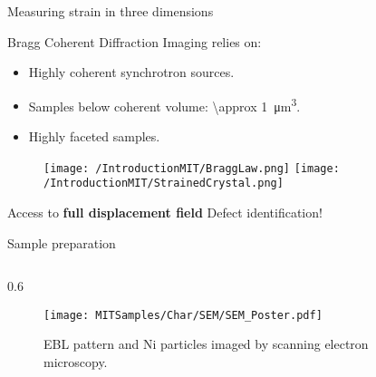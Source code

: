 
\separatorcolumn

\begin{column}{\colwidth}

    \begin{alertblock}{Measuring strain in three dimensions}

        Bragg Coherent Diffraction Imaging relies on:

        \begin{itemize}
            \setlength\itemsep{1em}
            \item Highly coherent synchrotron sources.
            \item Samples below coherent volume: \qty{\approx 1}{\um^3}.
            \item Highly faceted samples.
        \end{itemize}

        \begin{figure}
            \texttt{[image: /IntroductionMIT/BraggLaw.png]}
            \texttt{[image: /IntroductionMIT/StrainedCrystal.png]}
        \end{figure}

        \centering
        Access to \textbf{full displacement field} \textrightarrow Defect identification!

    \end{alertblock}

    \begin{block}{Sample preparation}

        \begin{columns}[T]
            \begin{column}{0.6\colwidth}
                \begin{figure}
                    \centering
                    \texttt{[image: MITSamples/Char/SEM/SEM\_Poster.pdf]}
                    \caption{EBL pattern and Ni particles imaged by scanning electron microscopy.}
                    \label{fig:EBLPattern}
                \end{figure}
            \end{column}


\end{columns}
\end{block}
\end{column}
